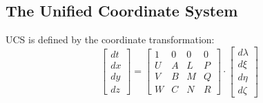 \subsection{The Unified Coordinate System}
\label{sec:UCS-UCS-derivation}
UCS is defined by the coordinate transformation:
\begin{equation}
\label{eq:UCS-transformation}
\left[ {\begin{array}{*{20}{c}}
{dt}\\
{dx}\\
{dy}\\
{dz}
\end{array}} \right] = \left[ {\begin{array}{*{20}{c}}
1&0&0&0\\
U&A&L&P\\
V&B&M&Q\\
W&C&N&R
\end{array}} \right] \cdot \left[ {\begin{array}{*{20}{c}}
{d\lambda }\\
{d\xi }\\
{d\eta }\\
{d\zeta }
\end{array}} \right]
\end{equation}

